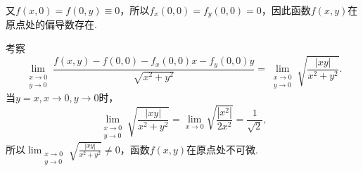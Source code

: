 \documentclass[../main.tex]{subfiles}
\begin{document}
\begin{enumerate}
          又$f(x,0)=f(0,y)\equiv 0$，所以$f_{x}(0,0)=f_{y}(0,0)=0$，因此函数$f(x,y)$在原点处的偏导数存在.

          考察
          \[
              \lim_{\substack{x\to 0 \\ y\to 0}}\frac{f(x,y)-f(0,0)-f_{x}(0,0)x-f_{y}(0,0)y}{\sqrt{x^{2}+y^{2}}}
              = \lim_{\substack{x\to 0 \\ y\to 0}}\sqrt{\frac{|xy|}{x^{2}+y^{2}}}.
          \]
          当$y=x,x\to0,y\to0$时，
          \[
              \lim_{\substack{x\to 0 \\ y\to 0}}\sqrt{\frac{|xy|}{x^{2}+y^{2}}}
              = \lim_{x\to0}\sqrt{\frac{|x^{2}|}{2x^{2}}}= \frac{1}{\sqrt{2}},
          \]
          所以$\lim _{\substack{x\to 0 \\ y\to 0}}\sqrt{\frac{|xy|}{x^{2}+y^{2}}}\neq 0$，函数$f(x,y)$在原点处不可微.

\end{enumerate}
\end{document}
